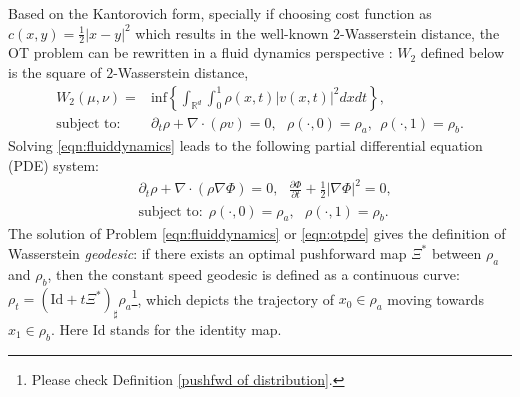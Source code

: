 \documentclass{article}
\begin{document}
Based on the Kantorovich form, specially if choosing cost function as $c(x,y) = \frac{1}{2}|x-y|^2$ which results in the well-known $2$-Wasserstein distance, %
the OT problem can be rewritten in a fluid dynamics perspective \citep{benamou2}: %
$W_2$ defined below is the square of $2$-Wasserstein distance,
\begin{align}
    W_2(\mu,\nu) = & \textrm{inf} \left\{ \int_{\mathbb{R}^d}\int_0^1\rho(x,t)|v(x,t)|^2dxdt\right\},\nonumber\\
    \text{subject to:}~~&\partial_t\rho + \nabla\cdot(\rho v)=0,~~~\rho(\cdot,0) = \rho_a, ~~ \rho(\cdot,1) = \rho_b.
    \label{eqn:fluiddynamics}
\end{align}
Solving \eqref{eqn:fluiddynamics} leads to the following partial differential equation (PDE) system:
\begin{align}
    &\partial_t\rho + \nabla\cdot(\rho \nabla \Phi)=0, ~~~\frac{\partial \Phi}{\partial t} + \frac{1}{2}|\nabla \Phi|^2 = 0,  \nonumber\\
    &\text{subject to:}~~\rho(\cdot,0) = \rho_a, ~~~ \rho(\cdot, 1) = \rho_b.
    \label{eqn:otpde}
\end{align}
The solution of Problem \eqref{eqn:fluiddynamics} or \eqref{eqn:otpde} gives the definition of Wasserstein {\it geodesic}: if there exists an optimal pushforward map $\Xi^*$ between $\rho_a$ and $\rho_b$, then the constant speed geodesic is defined as a continuous curve: $\rho_t = (\textrm{Id} + t \Xi^*)_\sharp \rho_a$\footnote{Please check Definition \ref{pushfwd of distribution}.
}, which depicts the trajectory of $x_0 \in \rho_a$ moving towards $x_1 \in \rho_b$. Here $\textrm{Id}$ stands for the identity map.
\end{document}
